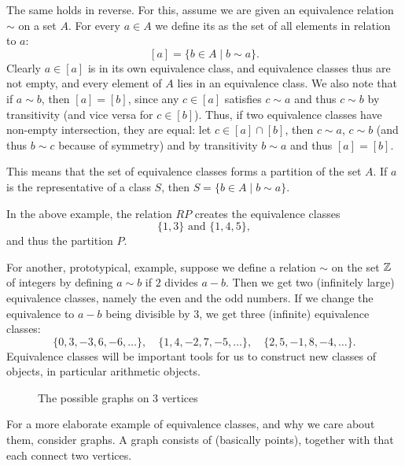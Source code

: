 The same holds in reverse. For this, assume we are given an equivalence
relation $\sim$ on a set $A$. For every $a\in A$ we 
define its  as the set of all elements in relation
to $a$:
\[
[a]=\{b\in A\mid b\sim a\}.
\]
Clearly $a\in[a]$ is in its own equivalence class, and equivalence classes
thus are not empty, and every element of $A$ lies in an equivalence class.
We also note that if $a\sim b$, then $[a]=[b]$, since any $c\in[a]$
satisfies $c\sim a$ and thus $c\sim b$ by transitivity (and vice versa for
$c\in[b]$). Thus, if two equivalence classes have non-empty intersection,
they are equal: let $c\in [a]\cap [b]$, then $c\sim a$, $c\sim b$ (and
thus $b\sim c$
because of symmetry) and by transitivity $b\sim a$ and thus $[a]=[b]$.

This means that the set of equivalence classes forms a partition of the set
$A$. If $a$ is the representative of a class $S$, then $S=\{b\in A\mid b\sim a\}$.

In the above example, the relation  $RP$
creates the equivalence classes
\[
\{1,3\}\mbox{\ and\ }\{1,4,5\},
\] and thus the partition $P$.

For another, prototypical, example, suppose we define a relation $\sim$ on the set ${\mathbb Z}$ of
integers by defining $a\sim b$ if $2$ divides $a-b$. Then we get two
(infinitely large)
equivalence classes, namely the even and the odd numbers. If we change the
equivalence to $a-b$ being divisible by $3$, we get three
(infinite) equivalence classes:
\[
\{0,3,-3,6,-6,\ldots\},\quad
\{1,4,-2,7,-5,\ldots\},\quad
\{2,5,-1,8,-4,\ldots\}.
\]
Equivalence classes will be important tools for us to construct new classes
of objects, in particular arithmetic objects.
\medskip

\begin{figure}[t]
\begin{center}
\end{center}
\caption{The possible graphs on 3 vertices}
\label{3vertexgraphs}
\end{figure}

For a more elaborate example of equivalence classes, and why we care about
them, consider graphs. A graph consists of  (basically
points), together with  that each connect two vertices.

